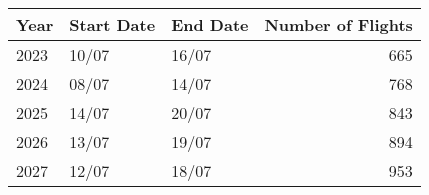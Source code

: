 \begin{table}[ht]
\centering
\begin{tabular}{lllr}
  \hline
Year & Start Date & End Date & Number of Flights \\ 
  \hline
2023 & 10/07 & 16/07 & 665 \\ 
  2024 & 08/07 & 14/07 & 768 \\ 
  2025 & 14/07 & 20/07 & 843 \\ 
  2026 & 13/07 & 19/07 & 894 \\ 
  2027 & 12/07 & 18/07 & 953 \\ 
   \hline
\end{tabular}
\caption{ \label{tab:anticipated_schedule}} 
\end{table}
